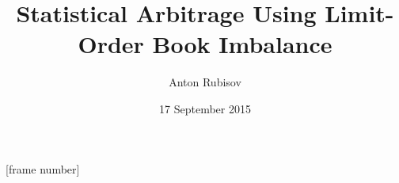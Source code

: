 \title[Arbitrage with Order Imbalance]{Statistical Arbitrage Using Limit-Order Book Imbalance}
\author{Anton Rubisov}
\date{17 September 2015}
\beamertemplatenavigationsymbolsempty
{}
[frame number]

\usepackage{booktabs}
\usepackage{adjustbox}
\usepackage{subfig}
\usepackage{bm} 			%
\usepackage{dsfont} 		%
\usepackage{multirow}

\DeclareMathOperator{\sgn}{\mathrm{sgn}}
\renewcommand{\d}{\ensuremath{\,\mathrm{d}}}
\renewcommand{\P}{\mathbb{P}}
\newcommand{\R}{\mathbb{R}}
\newcommand{\E}{\mathbb{E}}
\newcommand{\bP}{\bm{P}}
\newcommand{\bZ}{\bm{Z}}
\newcommand{\bj}{\bm{j}}
\newcommand{\bu}{\bm{u}}
\newcommand{\bw}{\bm{w}}
\newcommand{\bx}{\bm{x}}
\newcommand{\bz}{\bm{z}}
\newcommand{\btau}{\bm{\tau}}
\newcommand{\cF}{\mathcal{F}}
\newcommand{\cA}{\mathcal{A}}
\newcommand{\cL}{\mathcal{L}}
\newcommand{\indicator}{\mathds{1}}
\newcommand{\mat}[1]{\boldsymbol{#1}}
\newcommand{\ra}[1]{\renewcommand{\arraystretch}{#1}}
\newcommand\simcal[1]{\stackrel{\sim}{\smash{\mathcal{#1}}\rule{0pt}{1.2ex}}}


\newcommand{\cellbreak}[3]{%
  \begin{tabular}[#1]{@{}#2@{}}#3\end{tabular}}